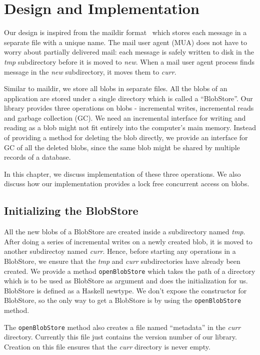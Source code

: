 \chapter{Design and Implementation}
\label{chap:design}

Our design is inspired from the maildir format~\cite{bernstein1995using} which stores each message in a separate file with a unique name. The mail user agent (MUA) does not have to worry about partially delivered mail: each message is safely written to disk in the \textit{tmp} subdirectory before it is moved to \textit{new}. When a mail user agent process finds message in the \textit{new} subdirectory, it moves them to \textit{curr}.

Similar to maildir, we store all blobs in separate files. All the blobs of an application are stored under a single directory which is called a ``BlobStore''.
Our library provides three operations on blobs - incremental writes, incremental reads and garbage collection (GC). We need an incremental interface for writing and reading as a blob might not fit entirely into the computer's main memory.
Instead of providing a method for deleting the blob directly, we provide an interface for GC of all the deleted blobs, since the same blob might be shared by multiple records of a database.

In this chapter, we discuss implementation of these three operations. We also discuss how our implementation provides a lock free concurrent access on blobs.

\section{Initializing the BlobStore}
All the new blobs of a BlobStore are created inside a subdirectory named \textit{tmp}. After doing a series of incremental writes on a newly created blob, it is moved to another subdirectoy named \textit{curr}. Hence, before starting any operations in a BlobStore, we ensure that the \textit{tmp} and \textit{curr} subdirectories have already been created.
We provide a method \texttt{openBlobStore} which takes the path of a directory which is to be used as BlobStore as argument and does the initialization for us.
BlobStore is defined as a Haskell newtype. We don't expose the constructor for BlobStore, so the only way to get a BlobStore is by using the \texttt{openBlobStore} method.

The \texttt{openBlobStore} method also creates a file named ``metadata'' in the \textit{curr} directory. Currently this file just contains the version
number of our library. Creation on this file ensures that the \textit{curr} directory is never empty.

